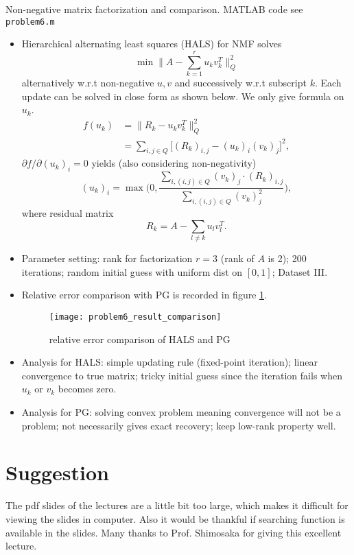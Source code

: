 \documentclass{article}
\begin{document}
\begin{myproof}[4.]
	Non-negative matrix factorization and comparison. MATLAB code see \verb|problem6.m|
	
	\begin{itemize}
		\item Hierarchical alternating least squares (HALS) for NMF solves
		\begin{equation}
		\min \|A-\sum_{k=1}^r u_k v_k^T\|_Q^2
		\end{equation}
		alternatively w.r.t non-negative $u,v$ and successively w.r.t subscript $k$. Each update can be solved in close form as shown below. We only give formula on $u_k$.
		\begin{align}
		  f(u_k) &= \|R_k - u_k v_k^T\|_Q^2\\
		         &= \sum_{i,j\in Q}\Big[(R_k)_{i,j}-(u_k)_i (v_k)_j\Big]^2,
		\end{align}
		$\partial f/\partial (u_k)_i=0$ yields (also considering non-negativity)
		\begin{equation}
		(u_k)_i = \max\Big(0, \frac{\sum_{i, (i,j)\in Q}(v_k)_j\cdot (R_k)_{i,j}}{\sum_{i, (i,j)\in Q} (v_k)_j^2}\Big),
		\end{equation}
		where residual matrix 
		\begin{equation}
		R_k = A-\sum_{l\neq k}u_l v_l^T.
		\end{equation}
		\item Parameter setting: rank for factorization $r=3$ (rank of $A$ is 2); 200 iterations; random initial guess with uniform dist on $[0,1]$;
		Dataset III.
		\item Relative error comparison with PG is recorded in figure \ref{fig:problem6resultcomparison}.
		\begin{figure}[h!]
			\centering
			\texttt{[image: problem6\_result\_comparison]}
			\caption{relative error comparison of HALS and PG}
			\label{fig:problem6resultcomparison}
		\end{figure}
		\item Analysis for HALS: simple updating rule (fixed-point iteration); linear convergence to true matrix; tricky initial guess since the iteration fails when $u_k$ or $v_k$ becomes zero.
		\item Analysis for PG: solving convex problem meaning convergence will not be a problem; not necessarily gives exact recovery; keep low-rank property well.
		
	\end{itemize}
\end{myproof}
\section*{Suggestion}
The pdf slides of the lectures are a little bit too large, which makes it difficult for viewing the slides in computer. Also it would be thankful if searching function is available in the slides. Many thanks to Prof. Shimosaka for giving this excellent lecture.
\end{document}
